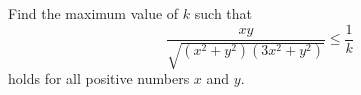 Find the maximum value of $k$ such that \[\frac{xy}{\sqrt{(x^2 + y^2)(3x^2 + y^2)}}\leq \frac{1}{k}\]
holds for all positive numbers $x$ and $y.$